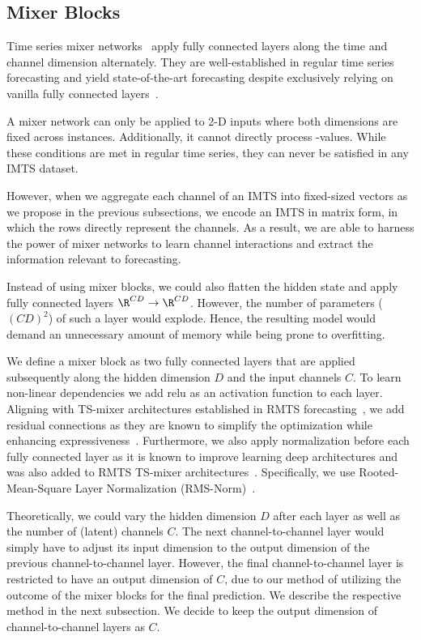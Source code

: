 \subsection{Mixer Blocks}



Time series mixer networks~\cite{Ekambaram2023.TSMixer,Chen2023.TSMixer} apply fully connected layers along the time and channel dimension alternately.  
They are well-established in regular time series forecasting and yield state-of-the-art forecasting despite exclusively relying on vanilla fully connected layers~\cite{Ekambaram2023.TSMixer,Chen2023.TSMixer}. 

A mixer network can only be applied to 2-D inputs where both dimensions are fixed across instances. 
Additionally, it cannot directly process \nan-values. 
While these conditions are met in regular time series, they can never be satisfied in any IMTS dataset.

However, when we aggregate each channel of an IMTS into fixed-sized vectors as we propose in the previous subsections, we encode an IMTS in matrix form, in which the rows 
directly represent the channels. As a result, we are able to harness the power of mixer networks to learn channel interactions and extract the information relevant to forecasting.   

Instead of using mixer blocks, we could also flatten the hidden state and apply fully connected layers  $\R^{CD} \to \R^{CD}$. 
However, the number of parameters (${(CD)}^2$) of such a layer would explode.
Hence, the resulting model would demand an unnecessary amount of memory while being prone to overfitting.

We define a mixer block as two fully connected layers that are applied subsequently along the hidden dimension $D$ and the input channels $C$.
To learn non-linear dependencies we add relu as an activation function to each layer. 
Aligning with TS-mixer architectures established in RMTS forecasting~\cite{Chen2023.TSMixer,Ekambaram2023.TSMixer}, we add residual connections as they are known to simplify the optimization while enhancing expressiveness~\cite{He2016.Deep}.
Furthermore, we also apply normalization before each fully connected layer as it is known to improve learning deep architectures and was also added to RMTS TS-mixer architectures~\cite{Chen2023.TSMixer,Ekambaram2023.TSMixer}.   
Specifically, we use Rooted-Mean-Square Layer Normalization (RMS-Norm)~\cite{Zhang2019.Root}. 

Theoretically, we could vary the hidden dimension $D$ after each layer as well as the number of (latent) channels $C$. The next channel-to-channel layer would simply have to adjust its input dimension to the output 
dimension of the previous channel-to-channel layer. However, the final channel-to-channel layer is restricted to have an output dimension of $C$, due to our method of utilizing the outcome of the mixer blocks for the final prediction.
We describe the respective method in the next subsection. We decide to keep the output dimension of channel-to-channel layers as $C$. 

